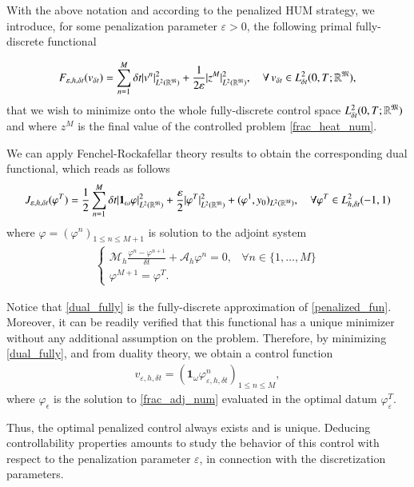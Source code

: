 With the above notation and according to the penalized HUM strategy, we introduce, for some penalization parameter $\varepsilon>0$, the following primal fully-discrete functional 

\begin{align*}
	F_{\varepsilon,h,\delta t}(v_{\delta t})=\sum_{n=1}^{M}\delta t |v^n|^2_{L^2(\mathbb{R}^{\mathfrak{M}})}+\frac{1}{2\varepsilon}|z^M|^2_{L^2(\mathbb{R}^{\mathfrak{M}})}, \quad \forall \, v_{\delta t}\in L_{\delta t}^2(0,T;\mathbb R^{\mathfrak{M}}),
\end{align*}
that we wish to minimize onto the whole fully-discrete control space $L_{\delta t}^2(0,T;\mathbb R^{\mathfrak{M}})$ and where $z^M$ is the final value of the controlled problem \eqref{frac_heat_num}. 

We can apply Fenchel-Rockafellar theory results to obtain the corresponding dual functional, which reads as follows
\begin{align}\label{dual_fully}
	J_{\varepsilon,h,\delta t}(\varphi^T)=\frac{1}{2}\sum_{n=1}^{M}\delta t|\mathbf 1_\omega\varphi|^2_{L^2(\mathbb{R}^{\mathfrak{M}})}+\frac{\varepsilon}{2}|\varphi^T|^2_{L^2(\mathbb{R}^{\mathfrak{M}})}+(\varphi^1,y_0)_{L^2(\mathbb{R}^{\mathfrak{M}})}, \quad \forall \varphi^T\in L_{h,\delta t}^2(-1,1)
\end{align}
where $\varphi=(\varphi^n)_{1\leq n\leq M+1}$ is solution to the adjoint system
\begin{align}\label{frac_adj_num}
	\begin{cases}
		\displaystyle\mathcal M_h \frac{\varphi^n-\varphi^{n+1}}{\delta t}+\mathcal A_h \varphi^n=0, & \forall n\in\{1,\ldots,M\}
		\\
		\varphi^{M+1}=\varphi^T. 
	\end{cases}
\end{align}

Notice that \eqref{dual_fully} is the fully-discrete approximation of \eqref{penalized_fun}. Moreover, it can be readily verified that this functional has a unique minimizer without any additional assumption on the problem. Therefore, by minimizing  \eqref{dual_fully}, and from duality theory, we obtain a control function 
\begin{align*}
	v_{\varepsilon,h,\delta t}=\left(\mathbf{1}_\omega\varphi_{\varepsilon,h,\delta t}^n\right)_{1\leq n\leq M},
\end{align*}
where $\varphi_\epsilon$ is the solution to \eqref{frac_adj_num} evaluated in the optimal datum $\varphi_\varepsilon^T$. 

Thus, the optimal penalized control always exists and is unique. Deducing controllability properties amounts to study the behavior of this control with respect to the penalization parameter $\varepsilon$, in connection with the discretization parameters.  

